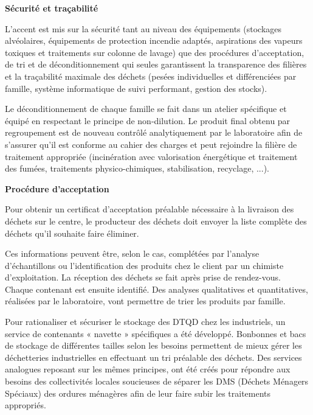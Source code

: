 \vspace{0.3cm}
\textbf{Sécurité et traçabilité }
\vspace{0.3cm}


L’accent est mis sur la sécurité tant au niveau des équipements (stockages alvéolaires, équipements de protection incendie adaptés, aspirations des vapeurs toxiques et traitements sur colonne de lavage) que des procédures d’acceptation, de tri et de déconditionnement qui seules garantissent la transparence des filières et la traçabilité maximale des déchets (pesées individuelles et différenciées par famille, système informatique de suivi performant, gestion des stocks).

\vspace{0.3cm}

Le déconditionnement de chaque famille se fait dans un atelier spécifique et équipé en respectant le principe de non-dilution. Le produit final obtenu par regroupement est de nouveau contrôlé analytiquement par le laboratoire afin de s’assurer qu’il est conforme au cahier des charges et peut rejoindre la filière de traitement appropriée (incinération avec valorisation énergétique et traitement des fumées, traitements physico-chimiques, stabilisation, recyclage, ...).



\vspace{0.3cm}
\textbf{Procédure d’acceptation}
\vspace{0.3cm}

Pour obtenir un certificat d’acceptation préalable nécessaire à la livraison des déchets sur le centre, le producteur des déchets doit envoyer la liste complète des déchets qu’il souhaite faire éliminer. 

\vspace{0.3cm}

Ces informations peuvent être, selon le cas, complétées par l’analyse d’échantillons ou l’identification des produits chez le client par un chimiste d’exploitation. 
La réception des déchets se fait après prise de rendez-vous. Chaque contenant est ensuite identifié. Des analyses qualitatives et quantitatives, réalisées par le laboratoire, vont permettre de trier les produits par famille. 

\vspace{0.3cm}

Pour rationaliser et sécuriser le stockage des DTQD chez les industriels, un service de contenants « navette » spécifiques a été développé. Bonbonnes et bacs de stockage de différentes tailles selon les besoins permettent de mieux gérer les déchetteries industrielles en effectuant un tri préalable des déchets. 
Des services analogues reposant sur les mêmes principes, ont été créés pour répondre aux besoins des collectivités locales soucieuses de séparer les DMS (Déchets Ménagers Spéciaux) des ordures ménagères afin de leur faire subir les traitements appropriés.


